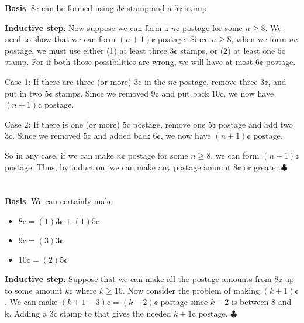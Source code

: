 \documentclass{article}
\begin{document}
\textbf{Basis}: $8\cent$ can be formed using $3\cent$ stamp and a $5\cent$ stamp


\textbf{Inductive step}: Now suppose we can form a $n\cent$ postage for some $n \ge 8$. We need to show that we can form $(n+1)\cent$ postage. Since $n \ge 8$, when we form $n\cent$ postage, we must use either (1) at least three $3\cent$ stamps, or (2) at least one $5\cent$ stamp. For if both those possibilities are wrong, we will have at most $6\cent$ postage.

Case 1: 
If there are three (or more) $3\cent$ in the $n\cent$ postage, remove three $3\cent$, and put in two $5\cent$ stamps. Since we removed $9\cent$ and put back $10\cent$, we now have $(n+1)\cent$ postage.

Case 2:
If there is one (or more) $5\cent$ postage, remove one $5\cent$ postage and add two $3\cent$. Since we removed $5\cent$ and added back $6\cent$, we now have $(n+1)\cent$ postage.

So in any case, if we can make $n\cent$ postage for some $n \ge 8$, we can form $(n+1)\cent$ postage. Thus, by induction, we can make any postage amount $8\cent$ or greater.$\clubsuit$

\section{}

\textbf{Basis}:  We can certainly make


\begin{itemize}
    \item[] $8\cent = (1)3\cent + (1)5\cent$
    \item[] $9\cent = (3)3\cent$
    \item[] $10\cent = (2)5\cent$
\end{itemize}


\textbf{Inductive step}: Suppose that we can make all the postage amounts from $8\cent$ up to some amount $k\cent$ where $k \ge 10$. Now consider the problem of making $(k+1)\cent$. We can make $(k + 1 - 3)\cent = (k - 2)\cent$ postage since $k-2$ is between 8 and k. Adding a $3\cent$ stamp to that gives the needed $k+1\cent$ postage. $\clubsuit$
\end{document}

